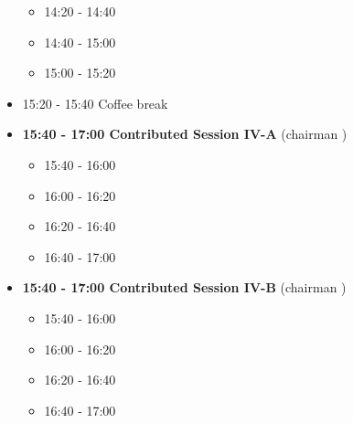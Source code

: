 \documentclass[10pt, A4]{article}%
\begin{document}
\begin{itemize}
\begin{itemize}
    \item 14:20 - 14:40 
    \item 14:40 - 15:00
    \item 15:00 - 15:20  
  \end{itemize}
  \item 15:20 - 15:40 Coffee break
  \item {\bf 15:40 - 17:00 Contributed Session IV-A} (chairman ) 
  \begin{itemize}
    \item 15:40 - 16:00
    \item 16:00 - 16:20 
    \item 16:20 - 16:40 
    \item 16:40 - 17:00
  \end{itemize}
  \item {\bf 15:40 - 17:00 Contributed Session IV-B} (chairman ) 
  \begin{itemize}
    \item 15:40 - 16:00
    \item 16:00 - 16:20 
    \item 16:20 - 16:40 
    \item 16:40 - 17:00
  \end{itemize}  
\end{itemize}


\newpage
\end{document}
